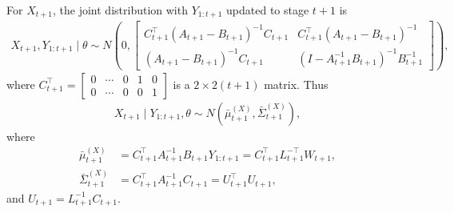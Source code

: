 For $X_{t+1}$, the joint distribution with $Y_{1:t+1}$ updated to stage $t+1$ is 
\begin{align*}
X_{t+1}, Y_{1:t+1}\mid \theta \sim N\left( 0, \begin{bmatrix}
C_{t+1}^\top\left(A_{t+1}-B_{t+1}\right) ^{-1}C_{t+1} & C_{t+1}^\top \left(A_{t+1}-B_{t+1}\right)^{-1}\\
\left(A_{t+1}-B_{t+1}\right)^{-1}C_{t+1} & \left(I- A_{t+1}^{-1}B_{t+1}\right) ^{-1}B_{t+1}^{-1}
\end{bmatrix} \right),
\end{align*}
where $C_{t+1}^\top = \begin{bmatrix}
0 & \cdots & 0 & 1 & 0 \\
0 & \cdots & 0 & 0 & 1
\end{bmatrix}$ is a $2 \times 2\left(t+1\right)$ matrix. Thus
\begin{align*}
X_{t+1}\mid Y_{1:t+1},\theta \sim N\left( \bar{\mu}_{t+1}^{\left(X\right)},\bar{\Sigma}_{t+1}^{\left(X\right)} \right),
\end{align*}
where
\begin{align*}
\bar{\mu}_{t+1}^{\left(X\right)} & = C_{t+1}^\top A_{t+1}^{-1}B_{t+1}Y_{1:t+1} =C_{t+1}^\top L_{t+1}^{-\top}W_{t+1},\\
\bar{\Sigma}_{t+1}^{\left(X\right)} & =C_{t+1}^\top A_{t+1}^{-1}C_{t+1} =U_{t+1}^\top U_{t+1},
\end{align*}
and $U_{t+1} = L_{t+1}^{-1} C_{t+1}$. %

